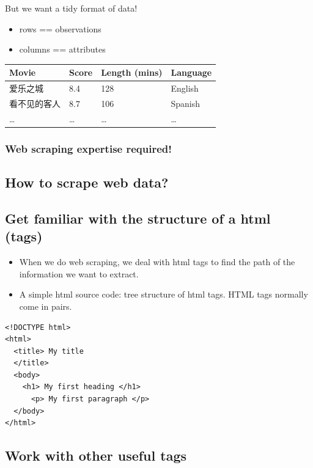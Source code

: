 But we want a tidy format of data!

\begin{itemize}
\tightlist
\item
  rows == observations
\item
  columns == attributes
\end{itemize}

\begin{longtable}[]{@{}llll@{}}
\toprule
Movie & Score & Length (mins) & Language\tabularnewline
\midrule
\endhead
爱乐之城 & 8.4 & 128 & English\tabularnewline
看不见的客人 & 8.7 & 106 & Spanish\tabularnewline
\ldots{} & \ldots{} & \ldots{} & \ldots{}\tabularnewline
\bottomrule
\end{longtable}

\subsubsection{\texorpdfstring{\textbf{Web scraping expertise
required!}}{Web scraping expertise required!}}\label{web-scraping-expertise-required}

\subsection{How to scrape web data?}\label{how-to-scrape-web-data}

\subsection{Get familiar with the structure of a html
(tags)}\label{get-familiar-with-the-structure-of-a-html-tags}

\begin{itemize}
\item
  When we do web scraping, we deal with html tags to find the path of
  the information we want to extract.
\item
  A simple html source code: tree structure of html tags. HTML tags
  normally come in pairs.
\end{itemize}

\begin{verbatim}
<!DOCTYPE html>
<html>
  <title> My title
  </title>
  <body>
    <h1> My first heading </h1>
      <p> My first paragraph </p>
  </body>
</html>
\end{verbatim}

\subsection{Work with other useful
tags}\label{work-with-other-useful-tags}

